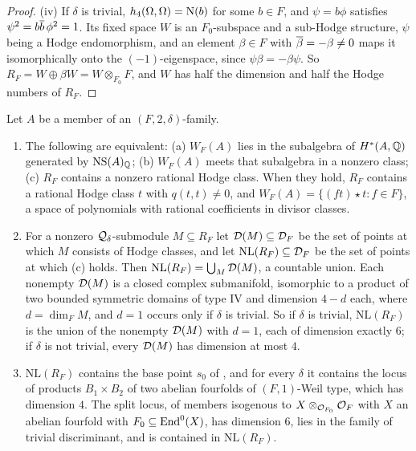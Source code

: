 \begin{proof}
(iv) If $\delta$ is trivial, $h_{4}(\Omega,\Omega)=\mathrm{N}(b)$ for some $b\in F$,
and $\psi=b\phi$ satisfies $\psi^{2}=b\overline{b}\,\phi^{2}=1$. Its fixed space
$W$ is an $F_{0}$-subspace and a sub-Hodge structure, $\psi$ being a Hodge
endomorphism, and an element $\beta\in F$ with $\overline{\beta}=-\beta\ne0$ maps it
isomorphically onto the $(-1)$-eigenspace, since $\psi\beta=-\beta\psi$. So
$R_{F}=W\oplus\beta W=W\otimes_{F_{0}}F$, and $W$ has half the dimension and
half the Hodge numbers of $R_{F}$.
\end{proof}

\begin{proposition}\label{prop:quarticnl}
Let $A$ be a member of an $(F,2,\delta)$-family.
\begin{enumerate}[label=\textup{(\roman*)},leftmargin=2.6em,itemsep=2pt]
\item The following are equivalent: \textup{(a)} $W_{F}(A)$ lies in the
  subalgebra of $H^{*}(A,\mathbb{Q})$ generated by $\mathrm{NS}(A)_{\mathbb{Q}}$; \textup{(b)}
  $W_{F}(A)$ meets that subalgebra in a nonzero class; \textup{(c)} $R_{F}$
  contains a nonzero rational Hodge class. When they hold, $R_{F}$ contains a
  rational Hodge class $t$ with $q(t,t)\ne0$, and
  $W_{F}(A)=\{(ft)\star t:f\in F\}$, a space of polynomials with rational
  coefficients in divisor classes.
\item For a nonzero $\mathcal{Q}_{\delta}$-submodule $M\subseteq R_{F}$ let
  $\mathcal{D}(M)\subseteq\mathcal{D}_{F}$ be the set of points at which $M$ consists of Hodge
  classes, and let $\mathrm{NL}(R_{F})\subseteq\mathcal{D}_{F}$ be the set of points at
  which \textup{(c)} holds. Then $\mathrm{NL}(R_{F})=\bigcup_{M}\mathcal{D}(M)$, a
  countable union. Each nonempty $\mathcal{D}(M)$ is a closed complex submanifold,
  isomorphic to a product of two bounded symmetric domains of type IV and
  dimension $4-d$ each, where $d=\dim_{F}M$, and $d=1$ occurs only if $\delta$ is
  trivial. So if $\delta$ is trivial, $\mathrm{NL}(R_{F})$ is the union of the
  nonempty $\mathcal{D}(M)$ with $d=1$, each of dimension exactly $6$; if $\delta$ is
  not trivial, every $\mathcal{D}(M)$ has dimension at most $4$.
\item $\mathrm{NL}(R_{F})$ contains the base point $s_{0}$ of
  \cite[Theorem~17.5]{paperI}, and for every $\delta$ it contains the locus of
  products $B_{1}\times B_{2}$ of two abelian fourfolds of $(F,1)$-Weil type,
  which has dimension $4$. The split locus, of members isogenous to
  $X\otimes_{\mathcal{O}_{F_{0}}}\mathcal{O}_{F}$ with $X$ an abelian fourfold with
  $F_{0}\subseteq\operatorname{End}^{0}(X)$, has dimension $6$, lies in the family of
  trivial discriminant, and is contained in $\mathrm{NL}(R_{F})$.
\end{enumerate}
\end{proposition}

